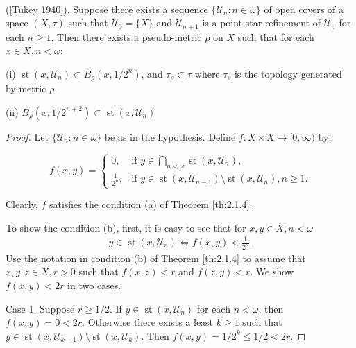 \documentclass[main.tex]{subfiles}
\begin{document}
{\theorem{}\label{th:2.1.5}
\textup{([Tukey 1940]\textsuperscript{\cite{Tukey}})}. Suppose there exists 
a sequence $\{\mathscr{U}_n: n\in\omega\}$ of open covers of a space $(X, \tau)$ 
such that $\mathscr{U}_0 = \{X\}$ and 
$\mathscr{U}_{n+1}$ is a point-star refinement of $\mathscr{U}_n$ for each $n \ge 1$. 
Then there exists a pseudo-metric $\rho$ on $X$ such that for each $x \in X, n < \omega:$

\textup{(i)}  $\operatorname{st}(x, \mathscr{U}_n) \subset B_\rho(x, 1/{2^n})$,
 and $\tau_\rho \subset \tau$ where  $\tau_\rho$ is the topology generated by metric $\rho$.

\textup{(ii)} $B_\rho(x, 1/{2^{n+2}}) \subset \operatorname{st}(x, \mathscr{U}_n)$
}

\begin{proof}
Let $\{\mathscr{U}_n: n\in\omega\}$ be as in the hypothesis. 
Define $f: X \times X \to [0, \infty)$ by:

$$f(x, y) =  \begin{cases} 
	 0, & \text{if } y \in \bigcap_{n < \omega} \operatorname{st}(x, \mathscr{U}_n), \\  
	 \frac{1}{2^n}, &
	   \text{if } y \in \operatorname{st}(x, \mathscr{U}_{n-1}) 
	   \setminus \operatorname{st}(x, \mathscr{U}_{n}), n \ge 1.  
\end{cases}$$

Clearly, $f$ satisfies the condition (a) of Theorem \ref{th:2.1.4}.

To show the condition (b), first, it is easy to see that
for $x, y \in X, n < \omega$
\begin{gather}
	y \in \operatorname{st}(x, \mathscr{U}_n) \iff f(x, y) < \frac{1}{2^n}. \label{eq:2.1.tukey}
\end{gather}
Use the notation in condition (b) of Theorem \ref{th:2.1.4} to
assume that $x, y, z \in X, r > 0$ such that $f(x, z) < r$ and $f(z, y) < r$.
We show $f(x, y) < 2r$ in
two cases.

Case 1. Suppose $r \ge 1/2$. If $y \in \operatorname{st}(x, \mathscr{U}_n)$ 
for each $n < \omega$, then $f(x, y) = 0 < 2r$. Otherwise there exists a least $k \ge 1$
 such that $y \in \operatorname{st}(x, \mathscr{U}_{k-1}) \setminus \operatorname{st}(x, \mathscr{U}_k)$. Then $f(x, y) = 1/{2^k} \le 1/2 < 2r$.


\end{proof}
\end{document}

